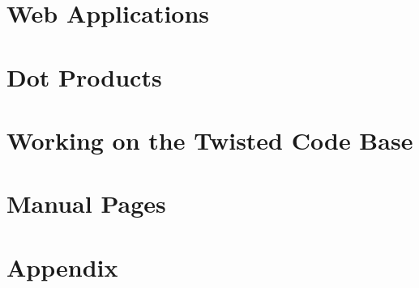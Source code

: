 \documentclass[oneside]{book}
\begin{document}
\chapter{Web Applications}







\chapter{Dot Products}





\chapter{Working on the Twisted Code Base}






\chapter{Manual Pages}


\clearpage

\clearpage

\clearpage

\clearpage

\clearpage

\clearpage

\clearpage

\clearpage

\clearpage

\clearpage

\clearpage
 


\chapter{Appendix}




\end{document}
